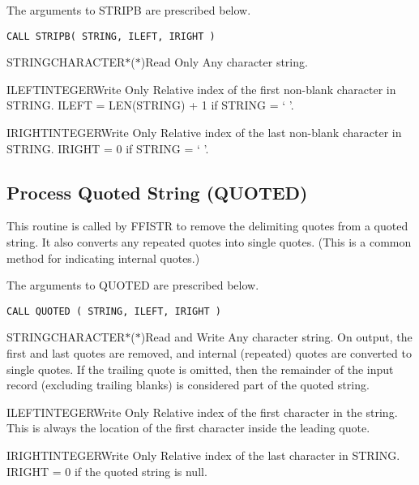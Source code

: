 The arguments to STRIPB are prescribed below.

\verb+CALL STRIPB( STRING, ILEFT, IRIGHT )+

\begin{argy}{STRING}{CHARACTER$*$($*$)}{Read Only}
Any character string.
\end{argy}

\begin{argy}{ILEFT}{INTEGER}{Write Only}
Relative index of the first non-blank character in
STRING.  ILEFT = LEN(STRING) + 1 if STRING = ` '.
\end{argy}

\begin{argy}{IRIGHT}{INTEGER}{Write Only}
Relative index of the last non-blank character in
STRING.  IRIGHT = 0 if STRING = ` '.
\end{argy}

\subsection{Process Quoted String (QUOTED)}\label{sec:quoted}
This routine is called by FFISTR to remove the delimiting quotes from a
quoted string. It also converts any repeated quotes into single quotes.
(This is a common method for indicating internal quotes.)

The arguments to QUOTED are prescribed below.

\verb+CALL QUOTED ( STRING, ILEFT, IRIGHT )+

\begin{argy}{STRING}{CHARACTER$*$($*$)}{Read and Write}
Any character string. On output, the first and last quotes are removed, and
internal (repeated) quotes are converted to single quotes. If the trailing
quote is omitted, then the remainder of the input record (excluding trailing
blanks) is considered part of the quoted string.
\end{argy}

\begin{argy}{ILEFT}{INTEGER}{Write Only}
Relative index of the first character in the string. This is always the
location of the first character inside the leading quote.
\end{argy}

\begin{argy}{IRIGHT}{INTEGER}{Write Only}
Relative index of the last character in
STRING.  IRIGHT = 0 if the quoted string is null.
\end{argy}

